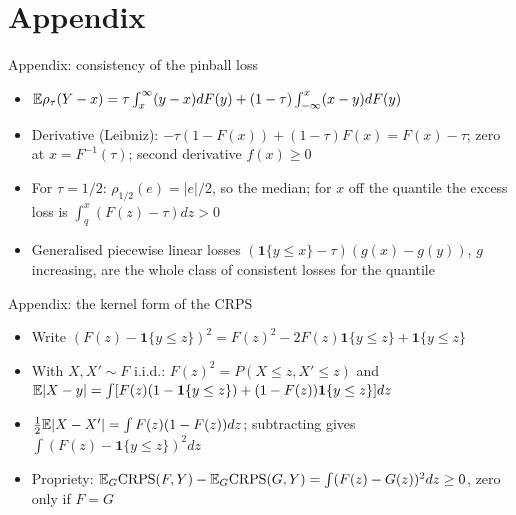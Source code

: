 \section{Appendix}

\begin{frame}{Appendix: consistency of the pinball loss}
\hypertarget{atsapp1}{}
\itemsize{\small}
\begin{itemize}
    \item $\mathbb{E}\rho_\tau(Y - x) = \tau\int_x^\infty(y - x)dF(y) + (1 - \tau)\int_{-\infty}^x(x - y)dF(y)$
    \item Derivative (Leibniz): $-\tau(1 - F(x)) + (1 - \tau)F(x) = F(x) - \tau$; zero at $x = F^{-1}(\tau)$; second derivative $f(x) \ge 0$
    \item For $\tau = 1/2$: $\rho_{1/2}(e) = |e|/2$, so the median; for $x$ off the quantile the excess loss is $\int_q^x(F(z) - \tau)dz > 0$
    \item Generalised piecewise linear losses $(\mathbf 1\{y \le x\} - \tau)(g(x) - g(y))$, $g$ increasing, are the whole class of consistent losses for the quantile 
\end{itemize}
\end{frame}

\begin{frame}{Appendix: the kernel form of the CRPS}
\hypertarget{atsapp2}{}
\itemsize{\small}
\begin{itemize}
    \item Write $(F(z) - \mathbf 1\{y \le z\})^2 = F(z)^2 - 2F(z)\mathbf 1\{y \le z\} + \mathbf 1\{y \le z\}$
    \item With $X, X' \sim F$ i.i.d.: $F(z)^2 = P(X \le z, X' \le z)$ and $\mathbb{E}|X - y| = \int[F(z)(1 - \mathbf 1\{y \le z\}) + (1 - F(z))\mathbf 1\{y \le z\}]dz$
    \item $\frac12\mathbb{E}|X - X'| = \int F(z)(1 - F(z))dz$; subtracting gives $\int(F(z) - \mathbf 1\{y \le z\})^2dz$
    \item Propriety: $\mathbb{E}_G\mathrm{CRPS}(F, Y) - \mathbb{E}_G\mathrm{CRPS}(G, Y) = \int(F(z) - G(z))^2dz \ge 0$, zero only if $F = G$
\end{itemize}
\end{frame}

